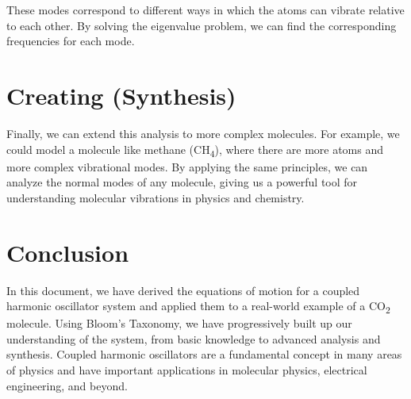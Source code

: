 \documentclass[16pt,a4paper]{article}
\begin{document}
These modes correspond to different ways in which the atoms can vibrate relative to each other. By solving the eigenvalue problem, we can find the corresponding frequencies for each mode.

\section{Creating (Synthesis)}
Finally, we can extend this analysis to more complex molecules. For example, we could model a molecule like methane (CH\textsubscript{4}), where there are more atoms and more complex vibrational modes. By applying the same principles, we can analyze the normal modes of any molecule, giving us a powerful tool for understanding molecular vibrations in physics and chemistry.

\section{Conclusion}
In this document, we have derived the equations of motion for a coupled harmonic oscillator system and applied them to a real-world example of a CO\textsubscript{2} molecule. Using Bloom’s Taxonomy, we have progressively built up our understanding of the system, from basic knowledge to advanced analysis and synthesis. Coupled harmonic oscillators are a fundamental concept in many areas of physics and have important applications in molecular physics, electrical engineering, and beyond.
\end{document}

